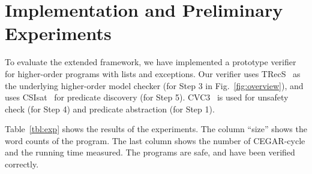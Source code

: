 \section{Implementation and Preliminary Experiments}
\label{sec:experiments}

To evaluate the extended framework, we have implemented a prototype
verifier for higher-order programs with lists and exceptions.
Our verifier uses TRecS~\cite{KobayashiPOPL2009,KobayashiPPDP2009} as
the underlying higher-order model checker (for Step 3 in
Fig.~\ref{fig:overview}), and uses CSIsat~\cite{Beyer2008} for predicate
discovery (for Step 5).  CVC3~\cite{Barrett2007} is used for unsafety
check (for Step 4) and predicate abstraction (for Step 1).

Table~\ref{tbl:exp} shows the results of the experiments.
The column ``size'' shows the word counts of the program.
The last column shows the number of CEGAR-cycle and the running time measured.
The programs are safe, and have been verified correctly.


